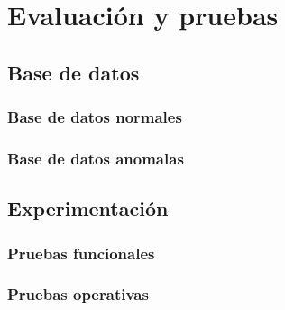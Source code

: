 \chapter{Evaluación y pruebas}
\label{capitulo5}
\section{Base de datos}
\subsection{Base de datos normales}
\subsection{Base de datos anomalas}
\section{Experimentación}
\subsection{Pruebas funcionales}
\subsection{Pruebas operativas}